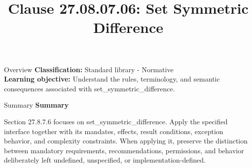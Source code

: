 \documentclass[10pt,letterpaper]{article}
\title{Clause 27.08.07.06: Set Symmetric Difference}
\author{}
\date{}
\begin{document}
\maketitle
\begin{CornellOverviewBox}{Overview}
\textbf{Classification:} Standard library - Normative\\[2pt]
\textbf{Learning objective:} Understand the rules, terminology, and semantic consequences associated with set\_symmetric\_difference.
\end{CornellOverviewBox}\begin{CornellSummaryBox}{Summary}
{\sffamily\bfseries\color{Accent} Summary}\par\vspace{3pt}Section 27.8.7.6 focuses on set\_symmetric\_difference. Apply the specified interface together with its mandates, effects, result conditions, exception behavior, and complexity constraints. When applying it, preserve the distinction between mandatory requirements, recommendations, permissions, and behavior deliberately left undefined, unspecified, or implementation-defined.
\end{CornellSummaryBox}
\end{document}
